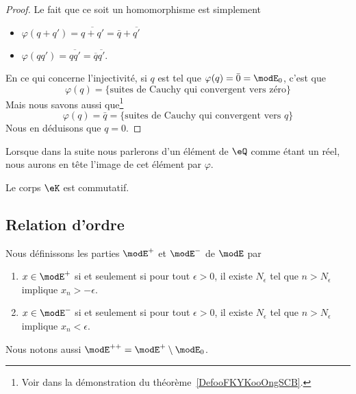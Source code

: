 \begin{proof}
    Le fait que ce soit un homomorphisme est simplement
    \begin{itemize}
        \item \( \varphi(q+q')=\overline{ q+q' }=\bar q+\overline{ q' }\)
        \item \( \varphi(qq')=\overline{ qq' }=\overline{ q }\overline{ q' }\).
    \end{itemize}
    En ce qui concerne l'injectivité, si \( q\) est tel que \( \varphi(q)=\bar 0=\modE_0\), c'est que
    \begin{equation}
        \varphi(q)=\{ \text{suites de Cauchy qui convergent vers zéro} \}
    \end{equation}
    Mais nous savons aussi que\footnote{Voir dans la démonstration du théorème~\ref{DefooFKYKooOngSCB}.}
    \begin{equation}
        \varphi(q)=\bar q=\{ \text{suites de Cauchy qui convergent vers } q \}
    \end{equation}
    Nous en déduisons que \( q=0\).
\end{proof}
Lorsque dans la suite nous parlerons d'un élément de \( \eQ\) comme étant un réel, nous aurons en tête l'image de cet élément par \( \varphi\).

\begin{proposition}
    Le corps \( \eK\) est commutatif.
\end{proposition}

\subsection{Relation d'ordre}

Nous définissons les parties \( \modE^+\) et \( \modE^-\) de \( \modE\) par
\begin{enumerate}
    \item
        \( x\in  \modE^+\) si et seulement si pour tout \( \epsilon>0\), il existe \( N_{\epsilon}\) tel que \( n>N_{\epsilon}\) implique \( x_n>-\epsilon\).
    \item
        \( x\in  \modE^-\) si et seulement si pour tout \( \epsilon>0\), il existe \( N_{\epsilon}\) tel que \( n>N_{\epsilon}\) implique \( x_n<\epsilon\).
\end{enumerate}
Nous notons aussi \( \modE^{++}=\modE^+\setminus\modE_0\).

